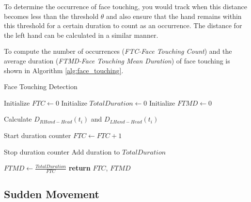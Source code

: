 To determine the occurrence of face touching, you would track when this distance becomes less than the threshold $\theta$ and also ensure that the hand remains within this threshold for a certain duration to count as an occurrence. The distance for the left hand can be calculated in a similar manner.

To compute the number of occurrences (\textit{FTC-Face Touching Count}) and the average duration (\textit{FTMD-Face Touching Mean Duration}) of face touching is shown in Algorithm \ref{alg:face_touching}.

    \begin{algorithm}
        \caption{Face Touching Detection}
          \label{alg:face_touching}
        \begin{algorithmic}[1]
          \Statex
            \State Initialize $FTC \gets 0$ 
            \State Initialize $TotalDuration \gets 0$ 
            \State Initialize $FTMD \gets 0$ 
            
              \State Calculate $D_{RHand-Head}(t_i)$ and $D_{LHand-Head}(t_i)$
              
                \State Start duration counter
                \State $FTC \gets FTC + 1$
              \EndIf
              
                \State Stop duration counter
                \State Add duration to $TotalDuration$
              \EndIf
            \EndFor
            
                \State $FTMD \gets \frac{TotalDuration}{FTC}$ 
            \EndIf
            \State \textbf{return} $FTC$, $FTMD$
          \EndFunction
        \end{algorithmic}
      \end{algorithm}

      
\subsection*{Sudden Movement }
\label{subsec:sudden_movement_analysis}

